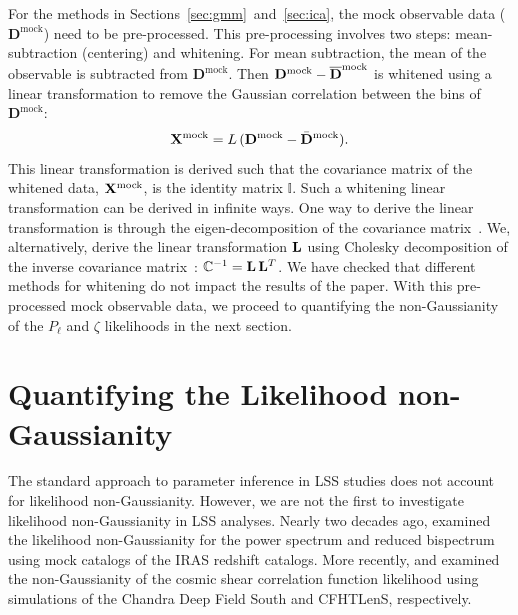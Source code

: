 \documentclass[12pt, letterpaper, preprint]{aastex6}
\newcommand{\beq}{\begin{equation}}
\newcommand{\eeq}{\end{equation}}
\newcommand{\Dmock}{\mathbf{D}^\mathrm{mock}}
\newcommand{\Xmock}{{\bf X}^\mathrm{mock}}
\newcommand{\lss}{{\small{LSS}}\xspace}
\begin{document}
For the methods in Sections~\ref{sec:gmm}~and~\ref{sec:ica}, the mock 
observable data ($\Dmock$) need to be pre-processed. This pre-processing
involves two steps: mean-subtraction (centering) and whitening. For mean subtraction, 
the mean of the observable is subtracted from $\Dmock$. Then 
$\Dmock - \overline{\bf D}^\mathrm{mock}$ is whitened using a linear transformation 
to remove the Gaussian correlation between the bins of $\Dmock$: 
\beq
\Xmock = L\,(\Dmock - \bar{\bf D}^\mathrm{mock}). 
\eeq
This linear transformation is derived such that the covariance matrix of the whitened 
data, $\Xmock$, is the identity matrix $\mathbb{I}$. Such a whitening linear 
transformation can be derived in infinite ways. 
One way to derive the linear transformation is through the eigen-decomposition
of the covariance matrix~\citep[\emph{e.g.}][]{hartlap2009, sellentin2017}. We, alternatively, 
derive the linear transformation ${\bf L}$ using Cholesky decomposition of the 
inverse covariance matrix~\citep{Press:1992:NRC:148286}: 
$\mathbb{C}^{-1} = {\bf L}\,{\bf L}^T$. We have checked that different methods 
for whitening do not impact the results of the paper. With this pre-processed 
mock observable data, we proceed to quantifying 
the non-Gaussianity of the $P_\ell$ and $\zeta$ likelihoods in the next section. 


\section{Quantifying the Likelihood non-Gaussianity} \label{sec:div}
The standard approach to parameter inference in \lss studies does not 
account for likelihood non-Gaussianity. 
However, we are not the first to investigate likelihood non-Gaussianity 
in \lss analyses. Nearly two decades ago, \cite{scoccimarro2000} examined 
the likelihood non-Gaussianity for the power spectrum and reduced bispectrum 
using mock catalogs of the IRAS redshift catalogs. More recently, 
\cite{hartlap2009} and \cite{sellentin2017} examined the non-Gaussianity 
of the cosmic shear correlation function likelihood using simulations of 
the Chandra Deep Field South and CFHTLenS, respectively. 
\end{document}
